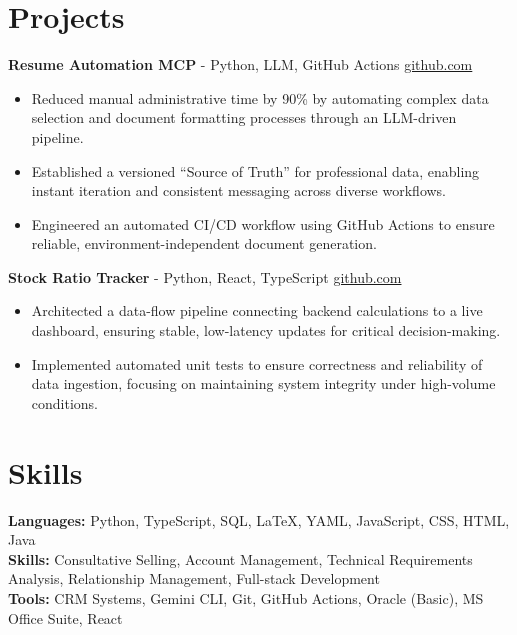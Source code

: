 \documentclass[11pt]{article}       %
\begin{document}
\section*{Projects}

\textbf{Resume Automation MCP}{ - Python, LLM, GitHub Actions} \hfill \href{https://github.com/Monica20030707/Tex_OrangeLeaf-mcp}{github.com} \\
\vspace{-9pt}
\begin{itemize}
  \item Reduced manual administrative time by 90\% by automating complex data selection and document formatting processes through an LLM-driven pipeline.
  \item Established a versioned ``Source of Truth'' for professional data, enabling instant iteration and consistent messaging across diverse workflows.
  \item Engineered an automated CI/CD workflow using GitHub Actions to ensure reliable, environment-independent document generation.
\end{itemize}

\textbf{Stock Ratio Tracker}{ - Python, React, TypeScript} \hfill \href{https://github.com/Monica20030707/tradingDashboard-UI}{github.com} \\
\vspace{-9pt}
\begin{itemize}
  \item Architected a data-flow pipeline connecting backend calculations to a live dashboard, ensuring stable, low-latency updates for critical decision-making. 
  \item Implemented automated unit tests to ensure correctness and reliability of data ingestion, focusing on maintaining system integrity under high-volume conditions.
\end{itemize}

\vspace{-18.5pt}

\section*{Skills}
\textbf{Languages:} Python, TypeScript, SQL, LaTeX, YAML, JavaScript, CSS, HTML, Java\\
\textbf{Skills:} Consultative Selling, Account Management, Technical Requirements Analysis, Relationship Management, Full-stack Development\\
\textbf{Tools:} CRM Systems, Gemini CLI, Git, GitHub Actions, Oracle (Basic), MS Office Suite, React\\

\vspace{-6.5pt}
\end{document}
